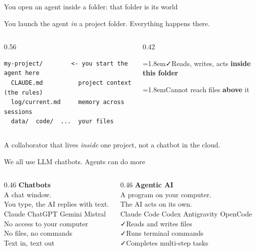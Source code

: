 \documentclass[aspectratio=169, 11pt, t]{beamer}
\newcommand{\mk}[1]{\textcolor{seeblau}{\textbf{#1}}}
\newcommand{\yes}{\textcolor{seeblau}{\faCheck}}
\newcommand{\warn}{\textcolor{akzentrot}{\faExclamationTriangle}}
\newcommand{\hint}[2]{\par\noindent\hangindent=1.8em\hangafter=1\textcolor{seeblau}{#1}\quad #2\par}
\begin{document}
\begin{frame}[fragile]{You open an agent inside a folder: that folder is its world}

\vfill
You launch the agent \emph{in} a project folder. Everything happens there.

\vspace{0.6em}
\begin{columns}[T]
  \begin{column}{0.56\textwidth}
\begin{lstlisting}
my-project/        <- you start the agent here
  CLAUDE.md          project context (the rules)
  log/current.md     memory across sessions
  data/  code/  ...  your files
\end{lstlisting}
  \end{column}
  \begin{column}{0.42\textwidth}
    \footnotesize
    \hint{\yes}{Reads, writes, acts \mk{inside this folder}}
    \hint{\warn}{Cannot reach files \mk{above} it}
  \end{column}
\end{columns}

\vfill
\centering
\textcolor{seeblau}{A collaborator that lives \emph{inside} one project, not a chatbot in the cloud.}

\end{frame}

\begin{frame}{We all use LLM chatbots. Agents can do more}

\vfill
\begin{columns}[T]
  \begin{column}{0.46\textwidth}
    \textbf{\textcolor{grau}{Chatbots}}\\[0.6em]
    A chat window. \\
    You type, the AI replies with text.\\[0.8em]
    {\scriptsize Claude\,\textbullet\,ChatGPT\,\textbullet\,Gemini\,\textbullet\,Mistral}\\[0.9em]
    \textcolor{grau}{\faTimes}\enspace No access to your computer\\[0.5em]
    \textcolor{grau}{\faTimes}\enspace No files, no commands\\[0.5em]
    \textcolor{grau}{\faTimes}\enspace Text in, text out
  \end{column}
  \hfill
  \begin{column}{0.46\textwidth}
    \textbf{\textcolor{seeblau}{Agentic AI}}\\[0.6em]
    A program on your computer.\\
    The AI acts on its own.\\[0.8em]
    {\scriptsize Claude Code\,\textbullet\,Codex\,\textbullet\,Antigravity\,\textbullet\,OpenCode}\\[0.9em]
    \yes\enspace Reads and writes files\\[0.5em]
    \yes\enspace Runs terminal commands\\[0.5em]
    \yes\enspace Completes multi-step tasks
  \end{column}
\end{columns}
\vfill

\end{frame}
\end{document}
